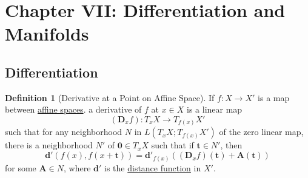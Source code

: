 \documentclass[letterpaper,12pt]{article}
\theoremstyle{plain}
\theoremstyle{plain}
\theoremstyle{definition}
\newtheorem{defn}{Definition}
\begin{document}
\section{Chapter VII: Differentiation and Manifolds}
\subsection{Differentiation}
\begin{defn}[Derivative at a Point on Affine Space]\label{defderivat}
If $f:X\rightarrow X'$ is a map between \hyperref[defafsp]{affine spaces}. a derivative of $f$ at $x\in X$ is a linear map
\[ (\mathbf{D}_xf):T_xX\rightarrow T_{f(x)}X' \]
such that for any neighborhood $N$ in $L(T_xX;T_{f(x)}X')$ of the zero linear map, there is a neighborhood $N'$ of $\mathbf{0}\in T_xX$ such that if $\mathbf{t}\in N'$, then
\[ \mathbf{d}'\left( f(x),f(x+\mathbf{t})\right) = \mathbf{d}'_{f(x)}\left( (\mathbf{D}_xf)(\mathbf{t})+\mathbf{A}(\mathbf{t})\right) \]
for some $\mathbf{A}\in N$, where $\mathbf{d}'$ is the \hyperref[defafsp]{distance function} in $X'$.
\end{defn}
\end{document}
